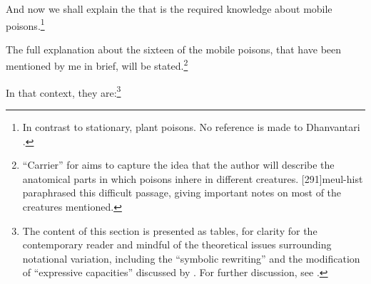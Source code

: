 \begin{translation}
  
  \item[1] 
  
And now we shall explain the  that is the
required knowledge about mobile poisons.\footnote{In contrast to
    stationary, plant poisons.  No reference is made to Dhanvantari
    \citep[see][]{birc-2021}.}

  \item[3] 
  
The full explanation about the sixteen  of
the mobile poisons, that have been mentioned by me in brief, will be
stated.\footnote{“Carrier” for  aims
    to capture the idea that the author will describe the anatomical parts
    in which poisons inhere in different creatures.  
    [291]{meul-hist} paraphrased
    this difficult passage, giving important notes on most of the
    creatures mentioned.}
  
\item[4] 

In that context, they are:\footnote{The content of this section is
    presented as tables, for clarity for the contemporary reader and
    mindful of the theoretical issues surrounding notational variation,
    including the “symbolic rewriting” and the modification of “expressive
    capacities” discussed by \citet[321\,ff]{saru-2016}.  For further
    discussion, see \cite[81--83]{wuja-2021}.}
  \begin{multicols}{2}
      
  \begin{enumerate} 
      

\end{enumerate}
\end{multicols}
\end{translation}
